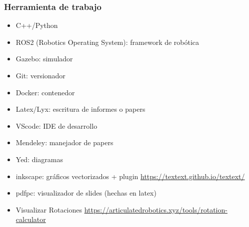 \begin{frame}
    \frametitle{Herramienta de trabajo}

    \begin{itemize}
        \item C++/Python
        \item ROS2 (Robotics Operating System): framework de robótica
        \item Gazebo: simulador
        \item Git: versionador
        \item Docker: contenedor
        \item Latex/Lyx: escritura de informes o papers
        \item VScode: IDE de desarrollo
        \item Mendeley: manejador de papers
        \item Yed: diagramas
        \item inkscape: gráficos vectorizados + plugin \href{TexText}{https://textext.github.io/textext/}
        \item pdfpc: visualizador de slides (hechas en latex)
        \item Visualizar Rotaciones \href{https://articulatedrobotics.xyz/tools/rotation-calculator}{https://articulatedrobotics.xyz/tools/rotation-calculator}
    \end{itemize}
\end{frame}